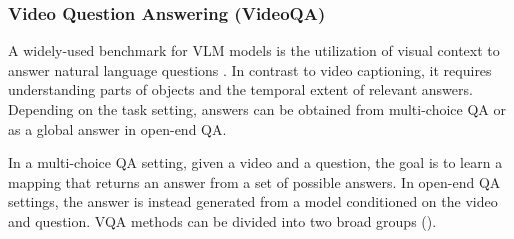 \subsubsection{Video Question Answering (VideoQA)}
\label{sec:recognition::language:::vqa}

A widely-used benchmark for VLM models is the utilization of visual context to answer natural language questions . In contrast to video captioning, it requires understanding parts of objects and the temporal extent of relevant answers. Depending on the task setting, answers can be obtained from multi-choice QA or as a global answer in open-end QA. 

In a multi-choice QA setting, given a video and a question, the goal is to learn a mapping that returns an answer from a set of possible answers. In open-end QA settings, the answer is instead generated from a model conditioned on the video and question. VQA methods can be divided into two broad groups ().

